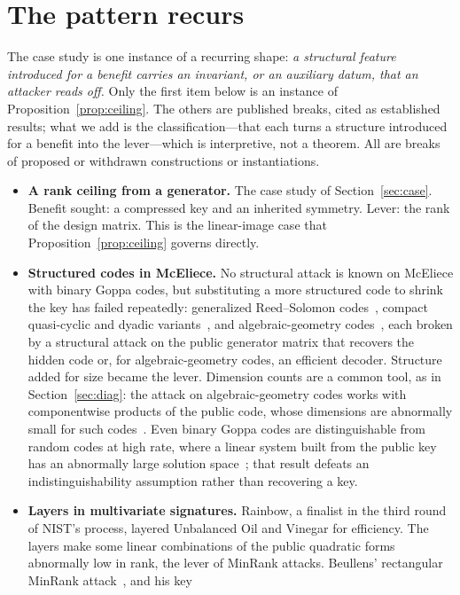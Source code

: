 \documentclass[11pt]{article}
\makeatletter
\theoremstyle{remark}
\DeclareRobustCommand{\_}{%
  \edef\@tempa{\ttdefault}%
  \ifx\f@family\@tempa\char95 \else\textunderscore\fi\penalty300\relax}
\makeatother
\begin{document}
\section{The pattern recurs}\label{sec:pattern}

The case study is one instance of a recurring shape: \emph{a structural feature introduced for a benefit carries an
invariant, or an auxiliary datum, that an attacker reads off.} Only the first item below is an instance of
Proposition~\ref{prop:ceiling}. The others are published breaks, cited as established results; what we add is the
classification---that each turns a structure introduced for a benefit into the lever---which is interpretive, not a
theorem. All are breaks of proposed or withdrawn constructions or instantiations.
\begin{itemize}
\item \textbf{A rank ceiling from a generator.} The case study of Section~\ref{sec:case}. Benefit sought: a compressed
  key and an inherited symmetry. Lever: the rank of the design matrix. This is the linear-image case that
  Proposition~\ref{prop:ceiling} governs directly.
\item \textbf{Structured codes in McEliece.} No structural attack is known on McEliece with binary Goppa codes, but
  substituting a more structured code to shrink the key has failed repeatedly: generalized Reed--Solomon
  codes~\cite{SS92}, compact quasi-cyclic and dyadic variants~\cite{FOPT10}, and algebraic-geometry codes~\cite{CMP14},
  each broken by a structural attack on the public generator matrix that recovers the hidden code or, for
  algebraic-geometry codes, an efficient decoder. Structure added for size became the lever. Dimension counts are a
  common tool, as in Section~\ref{sec:diag}: the attack on algebraic-geometry codes works with componentwise products of
  the public code, whose dimensions are abnormally small for such codes~\cite{CMP14}. Even binary Goppa codes are
  distinguishable from random codes at high rate, where a linear system built from the public key has an abnormally
  large solution space~\cite{FGOPT13}; that result defeats an indistinguishability assumption rather than recovering a
  key.
\item \textbf{Layers in multivariate signatures.} Rainbow, a finalist in the third round of NIST's process, layered
  Unbalanced Oil and Vinegar for efficiency. The layers make some linear combinations of the public quadratic forms
  abnormally low in rank, the lever of MinRank attacks. Beullens' rectangular MinRank attack~\cite{Beu21}, and his key

\end{itemize}
\end{document}

